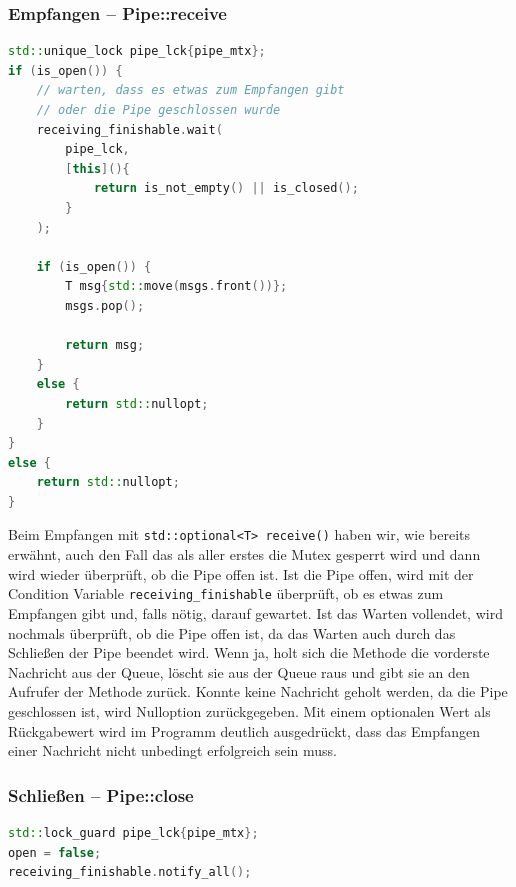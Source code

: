 \subsubsection{Empfangen -- Pipe::receive}
\label{sec:receive}

\noindent\hrulefill\par
\begin{minipage}{\linewidth}
\begin{lstlisting}[language=C++, caption=Empfangen einer Nachricht ... std::optional<T> receive()]
std::unique_lock pipe_lck{pipe_mtx};
if (is_open()) {
    // warten, dass es etwas zum Empfangen gibt
    // oder die Pipe geschlossen wurde
    receiving_finishable.wait(
        pipe_lck, 
        [this](){ 
            return is_not_empty() || is_closed(); 
        }
    );

    if (is_open()) {
        T msg{std::move(msgs.front())};
        msgs.pop();

        return msg;
    }
    else {
        return std::nullopt;
    }
}
else {
    return std::nullopt;
}
\end{lstlisting}
\end{minipage}

Beim Empfangen mit \verb|std::optional<T> receive()| haben wir, wie bereits erwähnt, auch den Fall das als aller erstes die Mutex gesperrt wird und 
dann wird wieder überprüft, ob die Pipe offen ist. Ist die Pipe offen, wird mit der Condition Variable \verb|receiving_finishable| überprüft, 
ob es etwas zum Empfangen gibt und, falls nötig, darauf gewartet. Ist das Warten vollendet, wird nochmals überprüft, ob die Pipe offen ist, da das Warten 
auch durch das Schließen der Pipe beendet wird. Wenn ja, holt sich die Methode die vorderste Nachricht aus der Queue, löscht sie aus der Queue raus und 
gibt sie an den Aufrufer der Methode zurück. Konnte keine Nachricht geholt werden, da die Pipe geschlossen ist, wird Nulloption zurückgegeben. 
Mit einem optionalen Wert als Rückgabewert wird im Programm deutlich ausgedrückt, dass das Empfangen einer Nachricht nicht unbedingt erfolgreich sein muss.

\subsubsection{Schließen -- Pipe::close}
\label{sec:close}

\noindent\hrulefill\par
\begin{minipage}{\linewidth}
\begin{lstlisting}[language=C++, caption=Schließen der Pipe ... void close()]
std::lock_guard pipe_lck{pipe_mtx};
open = false;
receiving_finishable.notify_all();
\end{lstlisting}
\end{minipage}

